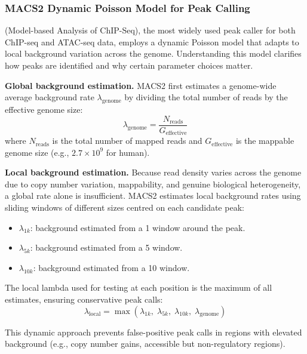 \subsubsection{MACS2 Dynamic Poisson Model for Peak Calling}
\label{subsubsec:chromatin:macs2-poisson}

 (Model-based Analysis of ChIP-Seq), the most widely used peak caller for both ChIP-seq and ATAC-seq data, employs a dynamic Poisson model that adapts to local background variation across the genome. Understanding this model clarifies how peaks are identified and why certain parameter choices matter.

\textbf{Global background estimation.} MACS2 first estimates a genome-wide average background rate $\lambda_{\text{genome}}$ by dividing the total number of reads by the effective genome size:
\begin{equation}
\label{eq:chromatin:macs2-global}
\lambda_{\text{genome}} = \frac{N_{\text{reads}}}{G_{\text{effective}}}
\end{equation}
where $N_{\text{reads}}$ is the total number of mapped reads and $G_{\text{effective}}$ is the mappable genome size (e.g., $2.7 \times 10^{9}$ for human).

\textbf{Local background estimation.} Because read density varies across the genome due to copy number variation, mappability, and genuine biological heterogeneity, a global rate alone is insufficient. MACS2 estimates local background rates using sliding windows of different sizes centred on each candidate peak:
\begin{itemize}[itemsep=2pt]
  \item $\lambda_{1k}$: background estimated from a 1\kilobase{} window around the peak.
  \item $\lambda_{5k}$: background estimated from a 5\kilobase{} window.
  \item $\lambda_{10k}$: background estimated from a 10\kilobase{} window.
\end{itemize}

The local lambda used for testing at each position is the maximum of all estimates, ensuring conservative peak calls:
\begin{equation}
\label{eq:chromatin:macs2-lambda}
\lambda_{\text{local}} = \max\!\left(\lambda_{1k},\; \lambda_{5k},\; \lambda_{10k},\; \lambda_{\text{genome}}\right)
\end{equation}

This dynamic approach prevents false-positive peak calls in regions with elevated background (e.g., copy number gains, accessible but non-regulatory regions).

